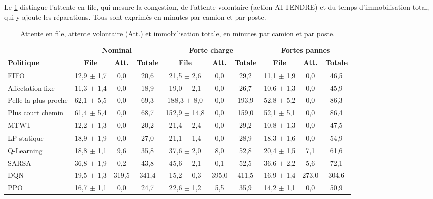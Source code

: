 \documentclass[11pt,a4paper]{article}
\newif\ifrevmarks
\newcommand{\revtag}[1]{\ifrevmarks\textsuperscript{\textcolor{red!70!black}{\scriptsize[#1]}}\fi}
\newenvironment{revbloc}[1]{\par\ifrevmarks\color{revcolor}\noindent\revtag{#1}\ \fi}{\par}
\newif\ifcorrmarks
\newcommand{\corr}[1]{\ifcorrmarks\textcolor{corrcolor}{#1}\else#1\fi}
\begin{document}
\begin{revbloc}{T31}
Le \cref{tab:waiting} distingue l'attente en file, qui mesure la congestion, de l'attente volontaire (action ATTENDRE) et du temps d'immobilisation total, qui y ajoute les réparations. Tous sont exprimés en minutes par camion et par poste.

\begin{table}[H]
\centering
\caption{Attente en file, attente volontaire (Att.) et immobilisation totale, en minutes par camion et par poste.}
\label{tab:waiting}
\scriptsize
\setlength{\tabcolsep}{3pt}
\begin{tabular}{@{}lccc|ccc|ccc@{}}
\toprule
 & \multicolumn{3}{c|}{\textbf{Nominal}} & \multicolumn{3}{c|}{\textbf{Forte charge}} & \multicolumn{3}{c}{\textbf{Fortes pannes}} \\
\textbf{Politique} & \textbf{File} & \textbf{Att.} & \textbf{Totale} & \textbf{File} & \textbf{Att.} & \textbf{Totale} & \textbf{File} & \textbf{Att.} & \textbf{Totale} \\
\midrule
FIFO                 & 12,9 $\pm$ 1,7 & 0,0 & 20,6 & 21,5 $\pm$ 2,6 & 0,0 & 29,2 & 11,1 $\pm$ 1,9 & 0,0 & 46,5 \\
Affectation fixe     & 11,3 $\pm$ 1,4 & 0,0 & 18,9 & 19,0 $\pm$ 2,1 & 0,0 & 26,7 & 10,6 $\pm$ 1,3 & 0,0 & 45,9 \\
Pelle la plus proche & 62,1 $\pm$ 5,5 & 0,0 & 69,3 & 188,3 $\pm$ 8,0 & 0,0 & 193,9 & 52,8 $\pm$ 5,2 & 0,0 & 86,3 \\
Plus court chemin    & 61,4 $\pm$ 5,4 & 0,0 & 68,7 & 152,9 $\pm$ 14,8 & 0,0 & 159,0 & 52,1 $\pm$ 5,1 & 0,0 & 86,4 \\
MTWT                 & 12,2 $\pm$ 1,3 & 0,0 & 20,2 & 21,4 $\pm$ 2,4 & 0,0 & 29,2 & 10,8 $\pm$ 1,3 & 0,0 & 47,5 \\
\corr{LP statique}                   & 18,9 $\pm$ 1,9 & 0,0 & 27,0 & 21,1 $\pm$ 1,4 & 0,0 & 28,9 & 18,3 $\pm$ 1,6 & 0,0 & 54,9 \\
\midrule
Q-Learning           & 18,8 $\pm$ 1,1 & 9,6 & 35,8 & 37,6 $\pm$ 2,0 & 8,0 & 52,8 & 20,4 $\pm$ 1,5 & 7,1 & 61,6 \\
SARSA                & 36,8 $\pm$ 1,9 & 0,2 & 43,8 & 45,6 $\pm$ 2,1 & 0,1 & 52,5 & 36,6 $\pm$ 2,2 & 5,6 & 72,1 \\
DQN                  & 19,5 $\pm$ 1,3 & 319,5 & 341,4 & 15,2 $\pm$ 0,3 & 395,0 & 411,5 & 16,9 $\pm$ 1,4 & 273,0 & 304,6 \\
PPO                  & 16,7 $\pm$ 1,1 & 0,0 & 24,7 & 22,6 $\pm$ 1,2 & 5,5 & 35,9 & 14,2 $\pm$ 1,1 & 0,0 & 50,9 \\
\bottomrule
\end{tabular}
\end{table}


\end{revbloc}
\end{document}
